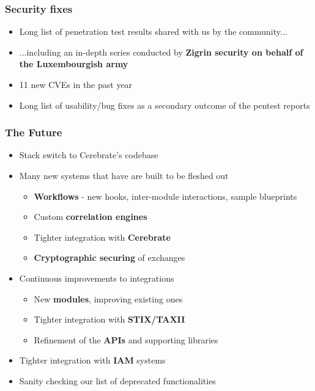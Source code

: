 \begin{frame}
  \frametitle{Security fixes}
  \begin{itemize}
     \item Long list of penetration test results shared with us by the community...
     \item ...including an in-depth series conducted by {\bf Zigrin security on behalf of the Luxembourgish army}
     \item 11 new CVEs in the past year
     \item Long list of usability/bug fixes as a secondary outcome of the pentest reports
  \end{itemize}
\end{frame}

\begin{frame}
  \frametitle{The Future}
  \begin{itemize}
     \item Stack switch to Cerebrate's codebase
     \item Many new systems that have are built to be fleshed out
     \begin{itemize}
         \item {\bf Workflows} - new hooks, inter-module interactions, sample blueprints
         \item Custom {\bf correlation engines}
         \item Tighter integration with {\bf Cerebrate}
         \item {\bf Cryptographic securing} of exchanges
     \end{itemize}
     \item Continuous improvements to integrations
     \begin{itemize}
         \item New {\bf modules}, improving existing ones
         \item Tighter integration with {\bf STIX/TAXII}
         \item Refinement of the {\bf APIs} and supporting libraries
     \end{itemize}
     \item Tighter integration with {\bf IAM} systems
     \item Sanity checking our list of deprecated functionalities
  \end{itemize}
\end{frame}

